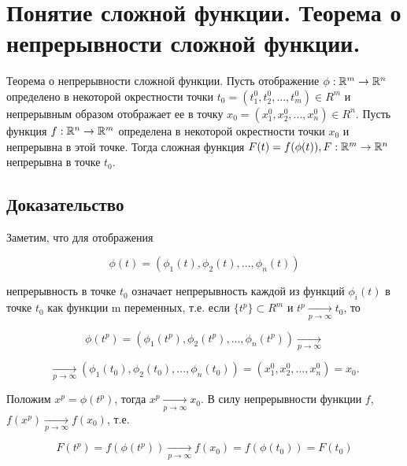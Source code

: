 \section{Понятие сложной функции. Теорема о непрерывности сложной функции.}

Теорема о непрерывности сложной функции. 
Пусть отображение $\phi : \mathbb{R}^m \rightarrow \mathbb{R}^n$ определено в некоторой окрестности точки $t_0 = (t^0_1, t^0_2, ..., t^0_m) \in R^m$ и непрерывным образом отображает ее в точку $x_0 = (x_1^0, x_2^0, ..., x_n^0) \in R^n$. Пусть функция $f: \mathbb{R}^n \rightarrow \mathbb{R}^m$ определена в некоторой окрестности точки $x_0$ и непрерывна в этой точке. Тогда сложная функция $F(t) = f(\phi (t)), F:\mathbb{R}^m \rightarrow \mathbb{R}^n$ непрерывна в точке $t_0$.

\subsection{Доказательство}

Заметим, что для отображения 

\begin{displaymath}
    \phi (t) = (\phi _1(t), \phi _2(t), ..., \phi _n(t))
\end{displaymath}

непрерывность в точке $t_0$ означает непрерывность каждой из функций $\phi _i(t)$ в точке $t_0$ как функции m переменных, т.е. если $\{t^p\} \subset R^m$ и $t^p \underset{p \rightarrow \infty}{\longrightarrow} t_0$, то

\begin{displaymath}
    \phi (t^p) = (\phi _1(t^p), \phi _2(t^p), ..., \phi _n(t^p)) \underset{p \rightarrow \infty}{\longrightarrow} 
\end{displaymath}

\begin{displaymath}
    \underset{p \rightarrow \infty}{\longrightarrow} (\phi _1(t_0), \phi _2(t_0), ..., \phi _n(t_0)) = (x_1^0, x_2^0, ..., x_n^0) = x_0.
\end{displaymath}

Положим $x^p = \phi (t^p)$, тогда $x^p \underset{p \rightarrow \infty}{\longrightarrow} x_0$. В силу непрерывности функции $f$, $f(x^p) \underset{p \rightarrow \infty}{\longrightarrow} f(x_0)$, т.е. 

\begin{displaymath}
    F(t^p) = f(\phi (t^p)) \underset{p \rightarrow \infty}{ \longrightarrow} f(x_0) = f(\phi (t_0)) = F(t_0)
\end{displaymath}
